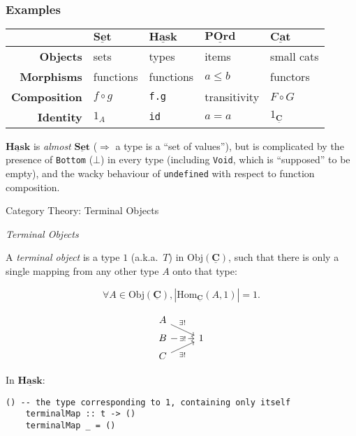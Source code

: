 \documentclass[10pt]{beamer}
\newcommand{\Cat}[1]{\ensuremath{\underline{\mathbf{#1}}}}
\newcommand{\Obj}[1]{\ensuremath{\mathrm{Obj}(\Cat{#1})}}
\newcommand{\Hom}[3]{\ensuremath{\mathrm{Hom}_{\Cat{#1}}(#2,#3)}}
\theoremstyle{definition}
\theoremstyle{remark}
\numberwithin{equation}{section}
\begin{document}
\begin{frame}[fragile]
  \frametitle{Examples}

  \begin{center}
    \begin{tabular}{r l l l l}\toprule
    & $\Cat{Set}$ & $\Cat{Hask}$ & $\Cat{POrd}$ & $\Cat{Cat}$ \\\midrule
    \textbf{Objects} & sets & types & items & small cats \\
    \textbf{Morphisms} & functions & functions & $a \leq b$ & functors \\
    \textbf{Composition} & $f \circ g$ & \lstinline!f.g! & transitivity & $F \circ G$ \\
    \textbf{Identity} & $1_A$ & {\lstinline!id!} & $a = a$ & $1_{\Cat{C}}$ \\\bottomrule
  \end{tabular}
  \end{center}

  $\Cat{Hask}$ is \emph{almost} $\Cat{Set}$ ($\Rightarrow$ a type is a ``set of values''),
  but is complicated by the presence of \lstinline{Bottom} ($\bot$) in every type
  (including \lstinline{Void}, which is ``supposed'' to be empty), and the wacky
  behaviour of \lstinline{undefined} with respect to function composition.
\end{frame}

\begin{frame}[fragile]{Category Theory: Terminal Objects}

  \emph{Terminal Objects}

  A \emph{terminal object} is a type $1$ (a.k.a.\ $T$) in $\Obj{C}$, such that there is only a single mapping from any other type $A$ onto that type:

  \[
    \forall A\in \Obj{C}, \left| \Hom{C}{A}{1} \right| = 1.
  \]

  \[
    \begin{tikzcd}[row sep=tiny]
      A \arrow[near start]{dr}{\exists!} & \\
      B \arrow["\exists!" description]{r} & 1\\
      C \arrow[swap,near start]{ur}{\exists!} & 
    \end{tikzcd}
  \]
  

  In \Cat{Hask}:
  \begin{lstlisting}[frame=single]
    () -- the type corresponding to 1, containing only itself
    terminalMap :: t -> ()
    terminalMap _ = ()
  \end{lstlisting}

\end{frame}
\end{document}
